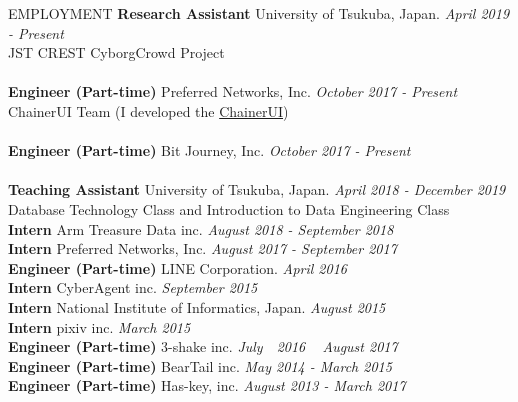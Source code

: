 \documentclass{resume} %
\begin{document}
\begin{rSection}{EMPLOYMENT}
{\bf Research Assistant} University of Tsukuba, Japan. \hfill {\em April 2019 - Present}
\\ JST CREST CyborgCrowd Project
\\\\
{\bf Engineer (Part-time) } Preferred Networks, Inc. \hfill {\em October 2017 - Present}
\\ ChainerUI Team (I developed the \href{https://github.com/chainer/chainerui}{ChainerUI})
\\\\
{\bf Engineer (Part-time) } Bit Journey, Inc. \hfill {\em October 2017 - Present} 
\\\\
{\bf Teaching Assistant } University of Tsukuba, Japan. \hfill {\em April 2018 - December 2019} 
\\ Database Technology Class and Introduction to Data Engineering Class
\\
{\bf Intern } Arm Treasure Data inc. \hfill {\em August 2018 - September 2018}
\\
{\bf Intern } Preferred Networks, Inc. \hfill {\em August 2017 - September 2017} 
\\
{\bf Engineer (Part-time) } LINE Corporation. \hfill {\em April 2016}
\\
{\bf Intern } CyberAgent inc. \hfill {\em September 2015}
\\
{\bf Intern } National Institute of Informatics, Japan. \hfill {\em August 2015}
\\
{\bf Intern } pixiv inc. \hfill {\em March 2015}
\\
{\bf Engineer (Part-time) } 3-shake inc. \hfill {\em July　2016 ~ August 2017}
\\
{\bf Engineer (Part-time) } BearTail inc. \hfill {\em May 2014 - March 2015}
\\
{\bf Engineer (Part-time) } Has-key, inc. \hfill {\em August 2013 - March 2017}
\end{rSection}



\end{document}
